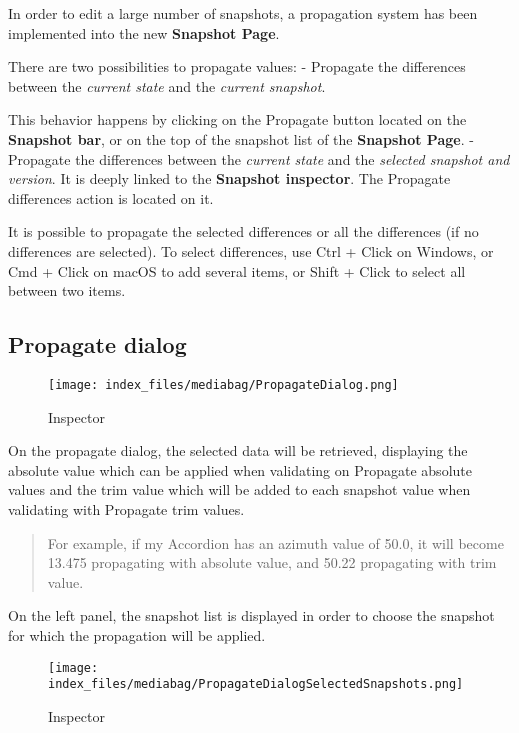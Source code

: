 \documentclass[
  letterpaper,
  DIV=11,
  numbers=noendperiod]{scrreport}
\begin{document}
In order to edit a large number of snapshots, a propagation system has
been implemented into the new \textbf{Snapshot Page}.

There are two possibilities to propagate values: - Propagate the
differences between the \emph{current state} and the \emph{current
snapshot}.

This behavior happens by clicking on the Propagate button located on the
\textbf{Snapshot bar}, or on the top of the snapshot list of the
\textbf{Snapshot Page}. - Propagate the differences between the
\emph{current state} and the \emph{selected snapshot and version}. It is
deeply linked to the \textbf{Snapshot inspector}. The Propagate
differences action is located on it.

It is possible to propagate the selected differences or all the
differences (if no differences are selected). To select differences, use
Ctrl + Click on Windows, or Cmd + Click on macOS to add several items,
or Shift + Click to select all between two items.

\hypertarget{propagate-dialog}{%
\subsection{Propagate dialog}\label{propagate-dialog}}

\begin{figure}

{\centering \texttt{[image: index\_files/mediabag/PropagateDialog.png]}

}

\caption{Inspector}

\end{figure}

On the propagate dialog, the selected data will be retrieved, displaying
the absolute value which can be applied when validating on Propagate
absolute values and the trim value which will be added to each snapshot
value when validating with Propagate trim values.

\begin{quote}
For example, if my Accordion has an azimuth value of 50.0, it will
become 13.475 propagating with absolute value, and 50.22 propagating
with trim value.
\end{quote}

On the left panel, the snapshot list is displayed in order to choose the
snapshot for which the propagation will be applied.

\begin{figure}

{\centering \texttt{[image: index\_files/mediabag/PropagateDialogSelectedSnapshots.png]}

}

\caption{Inspector}

\end{figure}
\end{document}
